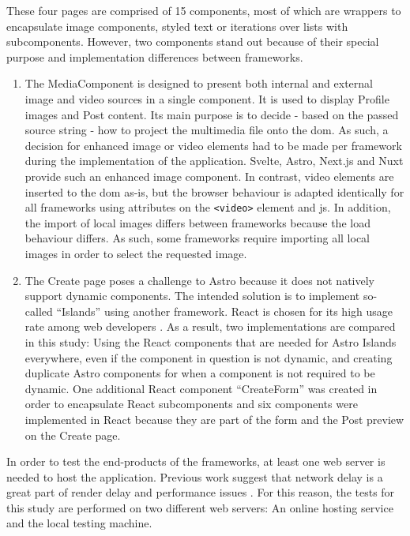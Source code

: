 \documentclass[a4paper, 12pt]{article}
\begin{document}
These four pages are comprised of 15 components, most of which are wrappers to encapsulate image components, styled text or iterations over lists with subcomponents.
However, two components stand out because of their special purpose and implementation differences between frameworks.

\begin{enumerate}
  \item The MediaComponent is designed to present both internal and external image and video sources in a single component.
  It is used to display Profile images and Post content.
  Its main purpose is to decide - based on the passed source string - how to project the multimedia file onto the \acrshort{dom}.
  As such, a decision for enhanced image or video elements had to be made per framework during the implementation of the application.
  Svelte, Astro, Next.js and Nuxt provide such an enhanced image component.
  In contrast, video elements are inserted to the \acrshort{dom} as-is, but the browser behaviour is adapted identically for all frameworks using attributes on the \verb|<video>| element and \acrlong{js}.
  In addition, the import of local images differs between frameworks because the load behaviour differs.
  As such, some frameworks require importing all local images in order to select the requested image.
  \item The Create page poses a challenge to Astro because it does not natively support dynamic components.
  The intended solution is to implement so-called \enquote{Islands} using another framework.
  React is chosen for its high usage rate among web developers \citep{stateOfJs2023}.
  As a result, two implementations are compared in this study: Using the React components that are needed for Astro Islands everywhere, even if the component in question is not dynamic, and creating duplicate Astro components for when a component is not required to be dynamic.
  One additional React component \enquote{CreateForm} was created in order to encapsulate React subcomponents and six components were implemented in React because they are part of the form and the Post preview on the Create page.
\end{enumerate}

In order to test the end-products of the frameworks, at least one web server is needed to host the application.
Previous work suggest that network delay is a great part of render delay and performance issues \citep{highperformancebrowsernetworking}.
For this reason, the tests for this study are performed on two different web servers: An online hosting service and the local testing machine.
\end{document}
